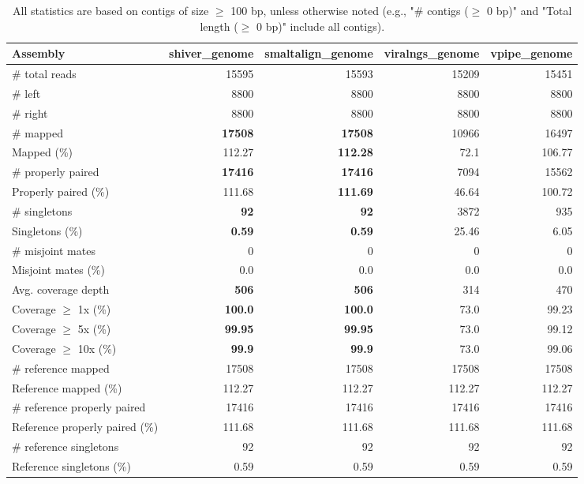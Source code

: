 \documentclass[12pt,a4paper]{article}
\begin{document}
\begin{table}[ht]
\begin{center}
\caption{All statistics are based on contigs of size $\geq$ 100 bp, unless otherwise noted (e.g., "\# contigs ($\geq$ 0 bp)" and "Total length ($\geq$ 0 bp)" include all contigs).}
\begin{tabular}{|l*{4}{|r}|}
\hline
Assembly & shiver\_genome & smaltalign\_genome & viralngs\_genome & vpipe\_genome \\ \hline
\# total reads & 15595 & 15593 & 15209 & 15451 \\ \hline
\# left & 8800 & 8800 & 8800 & 8800 \\ \hline
\# right & 8800 & 8800 & 8800 & 8800 \\ \hline
\# mapped & {\bf 17508} & {\bf 17508} & 10966 & 16497 \\ \hline
Mapped (\%) & 112.27 & {\bf 112.28} & 72.1 & 106.77 \\ \hline
\# properly paired & {\bf 17416} & {\bf 17416} & 7094 & 15562 \\ \hline
Properly paired (\%) & 111.68 & {\bf 111.69} & 46.64 & 100.72 \\ \hline
\# singletons & {\bf 92} & {\bf 92} & 3872 & 935 \\ \hline
Singletons (\%) & {\bf 0.59} & {\bf 0.59} & 25.46 & 6.05 \\ \hline
\# misjoint mates & 0 & 0 & 0 & 0 \\ \hline
Misjoint mates (\%) & 0.0 & 0.0 & 0.0 & 0.0 \\ \hline
Avg. coverage depth & {\bf 506} & {\bf 506} & 314 & 470 \\ \hline
Coverage $\geq$ 1x (\%) & {\bf 100.0} & {\bf 100.0} & 73.0 & 99.23 \\ \hline
Coverage $\geq$ 5x (\%) & {\bf 99.95} & {\bf 99.95} & 73.0 & 99.12 \\ \hline
Coverage $\geq$ 10x (\%) & {\bf 99.9} & {\bf 99.9} & 73.0 & 99.06 \\ \hline
\# reference mapped & 17508 & 17508 & 17508 & 17508 \\ \hline
Reference mapped (\%) & 112.27 & 112.27 & 112.27 & 112.27 \\ \hline
\# reference properly paired & 17416 & 17416 & 17416 & 17416 \\ \hline
Reference properly paired (\%) & 111.68 & 111.68 & 111.68 & 111.68 \\ \hline
\# reference singletons & 92 & 92 & 92 & 92 \\ \hline
Reference singletons (\%) & 0.59 & 0.59 & 0.59 & 0.59 \\ \hline

\end{tabular}
\end{center}
\end{table}
\end{document}

